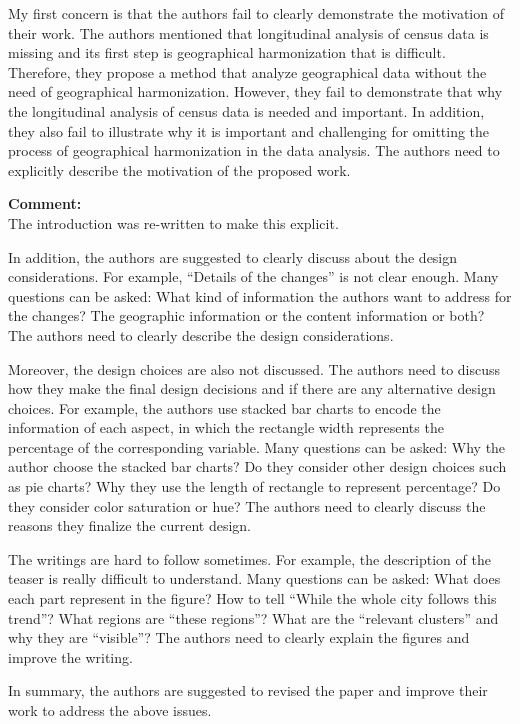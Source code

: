 \documentclass{article}
\newcommand{\reply}[1]{\begin{tcolorbox}\noindent\textbf{Comment:}\\#1\hfill\end{tcolorbox}}
\begin{document}
\begin{itemize}
{    My first concern is that the authors fail to clearly demonstrate the motivation of
    their work. The authors mentioned that longitudinal analysis of census data is
    missing and its first step is geographical harmonization that is difficult.
    Therefore, they propose a method that analyze geographical data without the need
    of geographical harmonization. However, they fail to demonstrate that why the
    longitudinal analysis of census data is needed and important. In addition, they
    also fail to illustrate why it is important and challenging for omitting the
    process of geographical harmonization in the data analysis. The authors need to
    explicitly describe the motivation of the proposed work.

    \reply{The introduction was re-written to make this explicit.}

    In addition, the authors are suggested to clearly discuss about the design
    considerations. For example, “Details of the changes” is not clear enough. Many
    questions can be asked: What kind of information the authors want to address for
    the changes? The geographic information or the content information or both? The
    authors need to clearly describe the design considerations.

    Moreover, the design choices are also not discussed. The authors need to discuss
    how they make the final design decisions and if there are any alternative design
    choices. For example, the authors use stacked bar charts to encode the information
    of each aspect, in which the rectangle width represents the percentage of the
    corresponding variable. Many questions can be asked: Why the author choose the
    stacked bar charts? Do they consider other design choices such as pie charts? Why
    they use the length of rectangle to represent percentage? Do they consider color
    saturation or hue? The authors need to clearly discuss the reasons they finalize
    the current design.

    The writings are hard to follow sometimes. For example, the description of the
    teaser is really difficult to understand. Many questions can be asked: What does
    each part represent in the figure? How to tell “While the whole city follows this
    trend”? What regions are “these regions”? What are the “relevant clusters” and why
    they are “visible”? The authors need to clearly explain the figures and improve
    the writing.

    In summary, the authors are suggested to revised the paper and improve their work
    to address the above issues.
}
\end{itemize}
\end{document}

